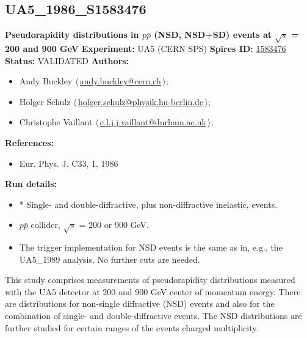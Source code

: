 \subsection[UA5\_1986\_S1583476]{UA5\_1986\_S1583476\,\cite{Alner:1986xu}}
\textbf{Pseudorapidity distributions in $p\bar{p}$ (NSD, NSD+SD) events at \ensuremath{\sqrt{s}} = 200 and 900 GeV}\newline
\textbf{Experiment:} UA5 (CERN SPS) \newline
\textbf{Spires ID:} \href{http://www.slac.stanford.edu/spires/find/hep/www?rawcmd=key+1583476}{1583476}\newline
\textbf{Status:} VALIDATED\newline
\textbf{Authors:}
\begin{itemize}
  \item Andy Buckley $\langle\,$\href{mailto:andy.buckley@cern.ch}{andy.buckley@cern.ch}$\,\rangle$;
  \item Holger Schulz $\langle\,$\href{mailto:holger.schulz@physik.hu-berlin.de}{holger.schulz@physik.hu-berlin.de}$\,\rangle$;
  \item Christophe Vaillant $\langle\,$\href{mailto:c.l.j.j.vaillant@durham.ac.uk}{c.l.j.j.vaillant@durham.ac.uk}$\,\rangle$;
\end{itemize}
\textbf{References:}
\begin{itemize}
  \item Eur. Phys. J. C33, 1, 1986
\end{itemize}
\textbf{Run details:}
\begin{itemize}

  \item * Single- and double-diffractive, plus non-diffractive inelastic, events.
  \item $p\bar{p}$ collider, \ensuremath{\sqrt{s}} = 200 or 900 GeV.
  \item The trigger implementation for NSD events is the same as in, e.g.,  the UA5_1989 analysis. No further cuts are needed.\end{itemize}

\noindent This study comprises measurements of pseudorapidity distributions measured with the UA5 detector at 200 and 900 GeV center of momentum energy. There are distributions for non-single diffractive (NSD) events and also for the combination of single- and double-diffractive events. The NSD distributions are further studied for certain ranges of the events charged multiplicity.

\clearpage


